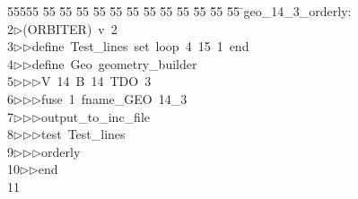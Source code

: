 %
%
\begin{tabbing}
55555 \= 55 \= 55 \= 55 \= 55 \= 55 \= 55 \= 55 \= 55 \= 55 \= 55 \= 55 \= 55 \= \>geo\_14\_3\_orderly:\\[0pt]
2\>$\triangleright$\>(ORBITER)\ v\ 2\ \\[0pt]
3\>$\triangleright$\>$\triangleright$\>define\ Test\_lines\ set\ loop\ 4\ 15\ 1\ end\ \\[0pt]
4\>$\triangleright$\>$\triangleright$\>define\ Geo\ geometry\_builder\ \\[0pt]
5\>$\triangleright$\>$\triangleright$\>$\triangleright$\>V\ 14\ B\ 14\ TDO\ 3\ \\[0pt]
6\>$\triangleright$\>$\triangleright$\>$\triangleright$\>fuse\ 1\ fname\_GEO\ 14\_3\ \\[0pt]
7\>$\triangleright$\>$\triangleright$\>$\triangleright$\>output\_to\_inc\_file\ \\[0pt]
8\>$\triangleright$\>$\triangleright$\>$\triangleright$\>test\ Test\_lines\ \\[0pt]
9\>$\triangleright$\>$\triangleright$\>$\triangleright$\>orderly\ \\[0pt]
10\>$\triangleright$\>$\triangleright$\>end\\[0pt]
11\>\end{tabbing}

